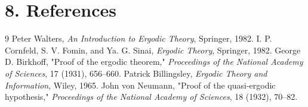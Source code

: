 \section*{8. References}

\begin{thebibliography}{9}
 Peter Walters, \emph{An Introduction to Ergodic Theory}, Springer, 1982.
 I. P. Cornfeld, S. V. Fomin, and Ya. G. Sinai, \emph{Ergodic Theory}, Springer, 1982.
 George D. Birkhoff, "Proof of the ergodic theorem," \emph{Proceedings of the National Academy of Sciences}, 17 (1931), 656--660.
 Patrick Billingsley, \emph{Ergodic Theory and Information}, Wiley, 1965.
 John von Neumann, "Proof of the quasi-ergodic hypothesis," \emph{Proceedings of the National Academy of Sciences}, 18 (1932), 70--82.
\end{thebibliography}
